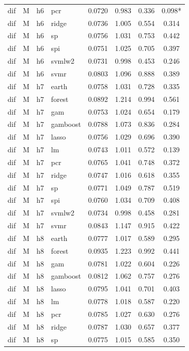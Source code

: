 \begin{ThreePartTable}
\begin{longtable}[t]{llclcccc}
dif & M & h6 & pcr & 0.0720 & 0.983 & 0.336 & 0.098*\\
dif & M & h6 & ridge & 0.0736 & 1.005 & 0.554 & 0.314\\
dif & M & h6 & sp & 0.0756 & 1.031 & 0.753 & 0.442\\
dif & M & h6 & spi & 0.0751 & 1.025 & 0.705 & 0.397\\
dif & M & h6 & svmlw2 & 0.0731 & 0.998 & 0.453 & 0.246\\
dif & M & h6 & svmr & 0.0803 & 1.096 & 0.888 & 0.389\\
\addlinespace
dif & M & h7 & earth & 0.0758 & 1.031 & 0.728 & 0.335\\
dif & M & h7 & forest & 0.0892 & 1.214 & 0.994 & 0.561\\
dif & M & h7 & gam & 0.0753 & 1.024 & 0.654 & 0.179\\
dif & M & h7 & gamboost & 0.0788 & 1.073 & 0.836 & 0.284\\
dif & M & h7 & lasso & 0.0756 & 1.029 & 0.696 & 0.390\\
dif & M & h7 & lm & 0.0743 & 1.011 & 0.572 & 0.139\\
dif & M & h7 & pcr & 0.0765 & 1.041 & 0.748 & 0.372\\
dif & M & h7 & ridge & 0.0747 & 1.016 & 0.618 & 0.355\\
dif & M & h7 & sp & 0.0771 & 1.049 & 0.787 & 0.519\\
dif & M & h7 & spi & 0.0760 & 1.034 & 0.709 & 0.408\\
dif & M & h7 & svmlw2 & 0.0734 & 0.998 & 0.458 & 0.281\\
dif & M & h7 & svmr & 0.0843 & 1.147 & 0.915 & 0.422\\
\addlinespace
dif & M & h8 & earth & 0.0777 & 1.017 & 0.589 & 0.295\\
dif & M & h8 & forest & 0.0935 & 1.223 & 0.992 & 0.441\\
dif & M & h8 & gam & 0.0781 & 1.022 & 0.604 & 0.226\\
dif & M & h8 & gamboost & 0.0812 & 1.062 & 0.757 & 0.276\\
dif & M & h8 & lasso & 0.0795 & 1.041 & 0.701 & 0.403\\
dif & M & h8 & lm & 0.0778 & 1.018 & 0.587 & 0.220\\
dif & M & h8 & pcr & 0.0785 & 1.027 & 0.630 & 0.276\\
dif & M & h8 & ridge & 0.0787 & 1.030 & 0.657 & 0.377\\
dif & M & h8 & sp & 0.0775 & 1.015 & 0.585 & 0.350\\

\end{longtable}
\end{ThreePartTable}
